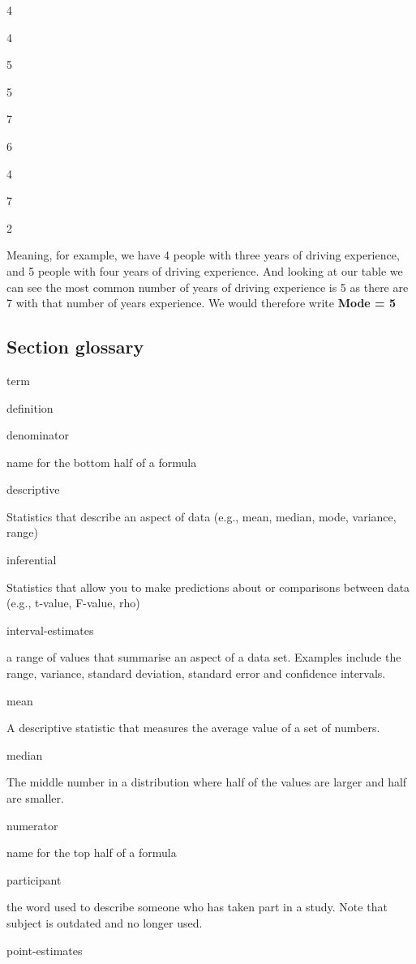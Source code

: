 \documentclass[
  oneside]{book}
\begin{document}
4

4

5

5

7

6

4

7

2

Meaning, for example, we have 4 people with three years of driving experience, and 5 people with four years of driving experience. And looking at our table we can see the most common number of years of driving experience is 5 as there are 7 with that number of years experience. We would therefore write \textbf{Mode = 5}

\hypertarget{section-glossary}{%
\subsection{Section glossary}\label{section-glossary}}

term

definition

denominator

name for the bottom half of a formula

descriptive

Statistics that describe an aspect of data (e.g., mean, median, mode, variance, range)

inferential

Statistics that allow you to make predictions about or comparisons between data (e.g., t-value, F-value, rho)

interval-estimates

a range of values that summarise an aspect of a data set. Examples include the range, variance, standard deviation, standard error and confidence intervals.

mean

A descriptive statistic that measures the average value of a set of numbers.

median

The middle number in a distribution where half of the values are larger and half are smaller.

numerator

name for the top half of a formula

participant

the word used to describe someone who has taken part in a study. Note that subject is outdated and no longer used.

point-estimates
\end{document}
